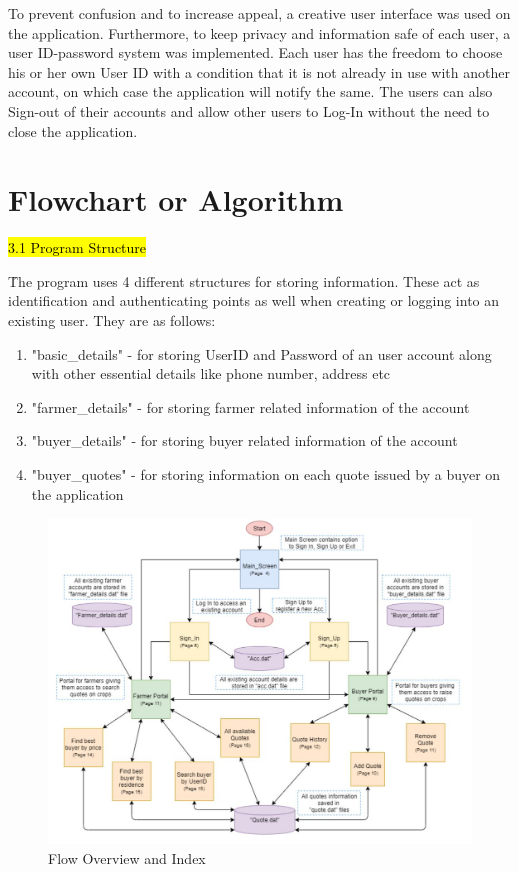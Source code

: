 \documentclass[12pt]{article}
\begin{document}
To prevent confusion and to increase appeal, a creative user interface was used on the application. Furthermore, to keep privacy and information safe of each user, a user ID-password system was implemented. Each user has the freedom to choose his or her own User ID with a condition that it is not already in use with another account, on which case the application will notify the same. The users can also Sign-out of their accounts and allow other users to Log-In without the need to close the application.



\newpage                            %
\section{Flowchart or Algorithm}    %

\hl {3.1 Program Structure}

\h The program uses 4 different structures for storing information. These act as identification and authenticating points as well when creating or logging into an existing user. They are as follows:

\begin{enumerate}
    \item "basic\_details" - for storing UserID and Password of an user account along with other essential details like phone number, address etc
    \item "farmer\_details" - for storing farmer related information of the account
    \item "buyer\_details" - for storing buyer related information of the account
    \item "buyer\_quotes" - for storing information on each quote issued by a buyer on the application
\end{enumerate}


\begin{figure}[h!]
    \centering
    \includegraphics[width = \columnwidth]{Overview.JPG}
    \caption{Flow Overview and Index}
\end{figure}
\end{document}
